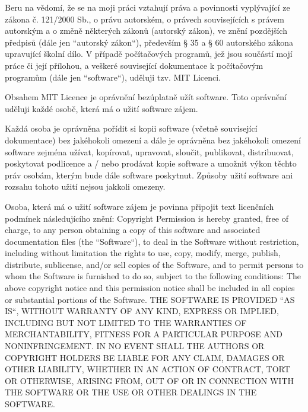 Beru na vědomí, že se na moji práci vztahují práva a povinnosti vyplývající ze zákona č. 121/2000 Sb., o právu autorském, o právech souvisejících s právem autorským a o změně některých zákonů (autorský zákon), ve znění pozdějších předpisů (dále jen ``autorský zákon``), především  § 35 a § 60 autorského zákona upravující školní dílo. V případě počítačových programů, jež jsou součástí mojí práce či její přílohou, a veškeré související dokumentace k počítačovým programům (dále jen ``software``), uděluji tzv. MIT Licenci.

Obsahem MIT Licence je oprávnění bezúplatně užít software. Toto oprávnění uděluji každé osobě, která má o užití software zájem.

Každá osoba je oprávněna pořídit si kopii software (včetně související dokumentace) bez jakéhokoli omezení a dále je oprávněna bez jakéhokoli omezení software zejména užívat, kopírovat, upravovat, sloučit, publikovat, distribuovat, poskytovat podlicence a / nebo prodávat kopie software a umožnit výkon těchto práv osobám, kterým bude dále software poskytnut. Způsoby užití software ani rozsahu tohoto užití nejsou jakkoli omezeny.

Osoba, která má o užití software zájem je povinna připojit text licenčních podmínek následujícího znění: 
\odsek Copyright \textsuperscript{\textcopyright} \RokOdevzdani \hspace{1pt} \AutorPrace
\odsek Permission is hereby granted, free of charge, to any person
\odsek obtaining a copy of this software and associated documentation
\odsek files (the ``Software``), to deal in the Software without
\odsek restriction, including without limitation the rights to use,
\odsek copy, modify, merge, publish, distribute, sublicense, and/or sell
\odsek copies of the Software, and to permit persons to whom the
\odsek Software is furnished to do so, subject to the following
\odsek conditions:
\odsek The above copyright notice and this permission notice shall be
\odsek included in all copies or substantial portions of the Software.
\footnotesize
\odsek THE SOFTWARE IS PROVIDED ``AS IS``, WITHOUT WARRANTY OF ANY KIND,
\odsek EXPRESS OR IMPLIED, INCLUDING BUT NOT LIMITED TO THE WARRANTIES
\odsek OF MERCHANTABILITY, FITNESS FOR A PARTICULAR PURPOSE AND
\odsek NONINFRINGEMENT. IN NO EVENT SHALL THE AUTHORS OR COPYRIGHT
\odsek HOLDERS BE LIABLE FOR ANY CLAIM, DAMAGES OR OTHER LIABILITY,
\odsek WHETHER IN AN ACTION OF CONTRACT, TORT OR OTHERWISE, ARISING
\odsek FROM, OUT OF OR IN CONNECTION WITH THE SOFTWARE OR THE USE OR
\odsek OTHER DEALINGS IN THE SOFTWARE.

